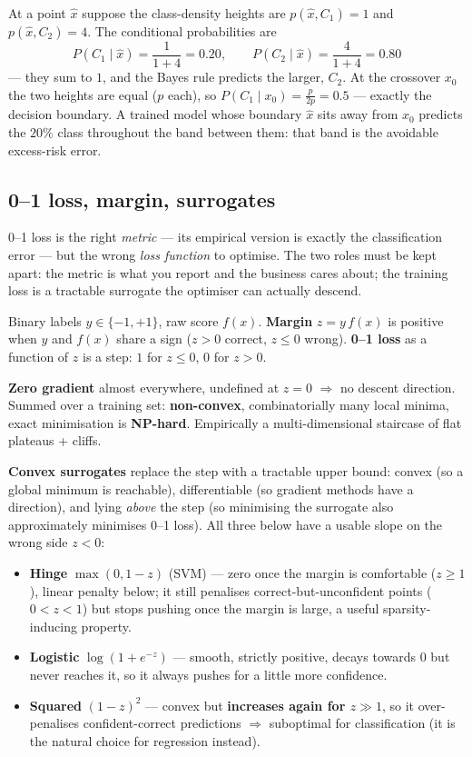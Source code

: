 \documentclass[11pt, a4paper]{article}
\newcommand{\kw}[1]{\textbf{#1}}
\begin{document}
\begin{exbox}
At a point $\hat x$ suppose the class-density heights are $p(\hat x,C_1)=1$ and $p(\hat x,C_2)=4$. The
conditional probabilities are
\[
P(C_1\mid\hat x)=\frac{1}{1+4}=0.20,\qquad P(C_2\mid\hat x)=\frac{4}{1+4}=0.80
\]
— they sum to $1$, and the Bayes rule predicts the larger, $C_2$. At the crossover $x_0$ the two
heights are equal ($p$ each), so $P(C_1\mid x_0)=\tfrac{p}{2p}=0.5$ — exactly the decision boundary.
A trained model whose boundary $\hat x$ sits away from $x_0$ predicts the $20\%$ class throughout the
band between them: that band is the avoidable excess-risk error.
\end{exbox}

\subsection{0--1 loss, margin, surrogates}

0--1 loss is the right \emph{metric} — its empirical version is exactly the classification error — but
the wrong \emph{loss function} to optimise. The two roles must be kept apart: the metric is what you
report and the business cares about; the training loss is a tractable surrogate the optimiser can
actually descend.

Binary labels $y\in\{-1,+1\}$, raw score $f(x)$. \kw{Margin} $z=y\,f(x)$ is positive when $y$ and
$f(x)$ share a sign ($z>0$ correct, $z\le0$ wrong). \kw{0--1 loss} as a function of $z$ is a step:
$1$ for $z\le0$, $0$ for $z>0$.

\begin{notebox}
\kw{Zero gradient} almost everywhere, undefined at $z{=}0$ $\Rightarrow$ no descent direction.
Summed over a training set: \kw{non-convex}, combinatorially many local minima, exact minimisation is
\kw{NP-hard}. Empirically a multi-dimensional staircase of flat plateaus + cliffs.
\end{notebox}

\kw{Convex surrogates} replace the step with a tractable upper bound: convex (so a global minimum is
reachable), differentiable (so gradient methods have a direction), and lying \emph{above} the step
(so minimising the surrogate also approximately minimises 0--1 loss). All three below have a usable
slope on the wrong side $z<0$:
\begin{itemize}
  \item \kw{Hinge} $\max(0,1-z)$ (SVM) — zero once the margin is comfortable ($z\ge1$), linear
  penalty below; it still penalises correct-but-unconfident points ($0<z<1$) but stops pushing once
  the margin is large, a useful sparsity-inducing property.
  \item \kw{Logistic} $\log(1+e^{-z})$ — smooth, strictly positive, decays towards 0 but never
  reaches it, so it always pushes for a little more confidence.
  \item \kw{Squared} $(1-z)^2$ — convex but \kw{increases again for $z\gg1$}, so it over-penalises
  confident-correct predictions $\Rightarrow$ suboptimal for classification (it is the natural choice
  for regression instead).
\end{itemize}
\end{document}

